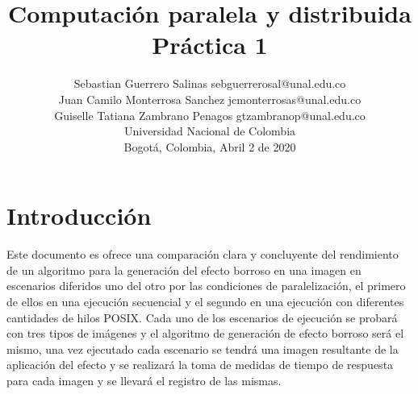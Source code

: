 \documentclass[a4paper,10pt]{IEEEtran}
\title{
    \Huge{Computación paralela y distribuida\\
    \Huge{Práctica 1}    
}}
\author{
\normalsize{
    Sebastian Guerrero Salinas \hspace{0.2cm} sebguerrerosal@unal.edu.co\\
    Juan Camilo Monterrosa Sanchez \hspace{0.2cm} jcmonterrosas@unal.edu.co\\
    Guiselle Tatiana Zambrano Penagos \hspace{0.2cm} gtzambranop@unal.edu.co\\
    Universidad Nacional de Colombia\\
    \normalsize{Bogotá, Colombia, Abril 2 de 2020}
    \vspace{-0.5cm}
}}
\begin{document}

\small

\section{Introducci\'on}
Este documento es ofrece una comparación clara y concluyente del rendimiento de
un algoritmo para la generaci\'on del efecto borroso en una imagen en
escenarios diferidos uno del otro por las condiciones de paralelizaci\'on, el
primero de ellos en una ejecuci\'on secuencial y el segundo en una ejecuci\'on
con diferentes cantidades de hilos POSIX. Cada uno de los escenarios de
ejecuci\'on se probar\'a con tres tipos de im\'agenes y el algoritmo de
generaci\'on de efecto borroso ser\'a el mismo, una vez ejecutado cada
escenario se tendr\'a una imagen resultante de la aplicaci\'on del efecto y se
realizar\'a la toma de medidas de tiempo de respuesta para cada imagen y se
llevar\'a el registro de las mismas.
\end{document}
